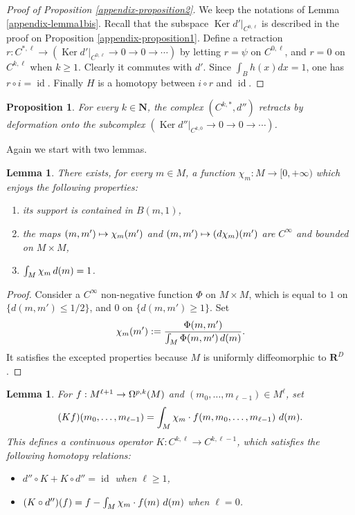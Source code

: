 \documentclass[JEP,XML,SOM,Unicode,published]{cedram}
\newcommand{\NoChangel}[1]{%
\expandafter\let\csname old\string#1\endcsname=#1
\let#1=\relax
\newcommand{#1}{\mathcode`l="716C\csname old\string#1\endcsname\mathcode`l="7160 }%
}
\newcommand\mto{\mathchoice{\longmapsto}{\mapsto}{\mapsto}{\mapsto}}
\newcommand{\loc}{\mathrm{loc}}\NoChangel{\loc}
\newcommand{\NN}{\mathbf{N}}
\newcommand{\RR}{\mathbf{R}}
\theoremstyle{plain}
\newtheorem{lemma}[equation]{Lemma}
\newtheorem{proposition}[equation]{Proposition}
\theoremstyle{remark}
\theoremstyle{definition}
\DeclareMathOperator{\id}{id}
\DeclareMathOperator{\Ker}{Ker}
\DeclareMathOperator{\vol}{vol}\NoChangel{\vol}
\newcommand{\restr}{\big|}
\begin{document}
\begin{proof}[Proof of Proposition \ref{appendix-proposition2}]
We keep the notations of Lemma \ref{appendix-lemma1bis}. Recall that the subspace $\Ker d' \restr_{C^{0, \ell}}$ is described
in the proof on Proposition \ref{appendix-proposition1}. Define a retraction
$r: C^{*,\ell} \to (\Ker d' \restr_{C^{0, \ell}} \to 0 \to 0 \to \cdots)$ by letting $r = \psi$ on $C^{0, \ell}$, and $r = 0$ on $C^{k, \ell}$
when $k \geqslant 1$. Clearly it commutes with $d'$. Since $\int_B h(x)dx = 1$, one has $r \circ i = \id$. Finally $H$ is a
homotopy between $i \circ r$ and $\id$.
\end{proof}

\begin{proposition} \label{appendix-proposition3} For every $k \in \NN$, the complex $(C^{k, *}, d'')$
retracts by deformation onto the subcomplex $(\Ker d'' \restr_{C^{k, 0}} \to 0 \to 0 \to \cdots)$.
\end{proposition}
Again we start with two lemmas.
\begin{lemma}\label{lemma-chi} There exists, for every $m \in M$, a function $\chi_m: M \to [0, +\infty)$ which enjoys the following properties:
\begin{enumerate}
\item\label{lemma-chi1} its support is contained in $B(m,1)$,
\item\label{lemma-chi2} the maps $(m, m') \mto \chi_m (m')$ and $(m, m') \mto (d\chi_m)(m')$ are $C^\infty$
and bounded on $M \times M$,
\item\label{lemma-chi3} $\int_M \chi_m \,d\vol(m) =1$.
\end{enumerate}
\end{lemma}

\begin{proof} Consider a $C^\infty$ non-negative function $\Phi$ on $M \times M$, which is equal to $1$
on $\{d(m,m') \leqslant 1/2\}$, and $0$ on $\{d(m,m') \geqslant 1\}$. Set
\[\chi_m (m'):= \frac{\Phi (m, m')}{\int_M \Phi (m, m') \,d\vol(m)}.\]
It satisfies the excepted properties because $M$ is uniformly diffeomorphic to
$\RR^D$.
\end{proof}

\begin{lemma}\label{appendix-lemma2}
For $f: M^{\ell +1} \to \Omega_{\loc}^{p,k}(M)$ and $(m_0, \dots, m_{\ell -1}) \in M^{\ell}$, set
\[(Kf)(m_0, \dots, m_{\ell -1}) = \int_M \chi_m \cdot f(m, m_0, \dots, m_{\ell -1})~ d\vol(m).\]
This defines a continuous operator $K: C^{k, \ell} \to C^{k, \ell-1}$, which satisfies the following homotopy relations:
\begin{itemize}
\item $d'' \circ K + K \circ d'' = \id$ when $\ell \geqslant 1$,
\item $(K \circ d'')(f) = f - \int_M \chi_m \cdot f(m)~ d\vol(m)$ when $\ell =0$.
\end{itemize}
\end{lemma}
\end{document}
